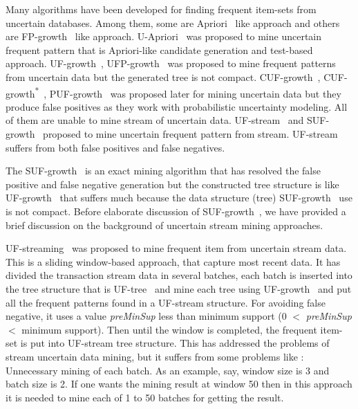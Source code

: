 \documentclass[conference]{IEEEtran}
\begin{document}
Many algorithms have been developed for finding frequent item-sets from uncertain databases. Among them, some are Apriori~\cite{DBLP:conf/vldb/AgrawalS94} like approach and others are FP-growth~\cite{DBLP:journals/datamine/HanPYM04} like approach. U-Apriori~\cite{DBLP:journals/tkde/ZhaoYN14} was proposed to mine uncertain frequent pattern that is Apriori-like candidate generation and test-based approach. UF-growth~\cite{DBLP:conf/kdd/GadeWK04}, UFP-growth~\cite{DBLP:conf/kdd/AggarwalLWW09} was proposed to mine frequent patterns from uncertain data but the generated tree is not compact. CUF-growth~\cite{DBLP:conf/dasfaa/LeungT12}, CUF-growth\textsuperscript{*}~\cite{DBLP:conf/dasfaa/LeungT12}, PUF-growth~\cite{DBLP:conf/pakdd/LeungT13} was proposed later for mining uncertain data but they produce false positives as they work with probabilistic uncertainty modeling. All of them are unable to mine stream of uncertain data. UF-stream~\cite{DBLP:conf/icde/LeungH09} and SUF-growth~\cite{DBLP:conf/icde/LeungH09} proposed to mine uncertain frequent pattern from stream. UF-stream~\cite{DBLP:conf/icde/LeungH09} suffers from both false positives and false negatives. 

The SUF-growth~\cite{DBLP:conf/icde/LeungH09} is an exact mining algorithm that has resolved the false positive and false negative generation but the constructed tree structure is like UF-growth~\cite{DBLP:conf/kdd/GadeWK04} that suffers much because the data structure (tree) SUF-growth~\cite{DBLP:conf/icde/LeungH09} use is not compact. Before elaborate discussion of SUF-growth~\cite{DBLP:conf/icde/LeungH09}, we have provided a brief discussion on the background of uncertain stream mining approaches.

UF-streaming~\cite{DBLP:conf/icde/LeungH09} was proposed to mine frequent item from uncertain stream data. This is a sliding window-based approach, that capture most recent data. It has divided the transaction stream data in several batches, each batch is inserted into the tree structure that is UF-tree~\cite{DBLP:conf/kdd/GadeWK04} and mine each tree using UF-growth~\cite{DBLP:conf/kdd/GadeWK04} and put all the frequent patterns found in a UF-stream structure. For avoiding false negative, it uses a value \emph{preMinSup} less than minimum support (0 $<$ \emph{preMinSup} $<$ minimum support). Then until the window is completed, the frequent item-set is put into UF-stream tree structure. This has addressed the problems of stream uncertain data mining, but it suffers from some problems like : Unnecessary mining of each batch. As an example, say, window size is 3 and batch size is 2. If one wants the mining result at window 50 then in this approach it is needed to mine each of 1 to 50 batches for getting the result.
\end{document}
